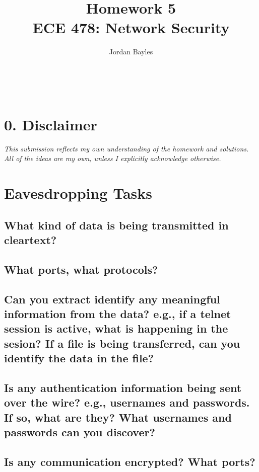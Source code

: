 \documentclass[12pt,letterpaper]{article}
\author{Jordan Bayles}
\title{Homework 5\\
\small ECE 478: Network Security}
\makeatletter
\let\thetitle\@title
\let\theauthor\@author
\let\thedate\@date
\makeatother
\begin{document}
\begin{flushright}
\theauthor\\
\thedate
\end{flushright}
\begin{center}
\thetitle
\end{center}

\section*{0. Disclaimer}
\emph{This submission reflects my own understanding of the homework and
solutions. All of the ideas are my own, unless I explicitly acknowledge otherwise.}

\section{Eavesdropping Tasks}
\subsection{What kind of data is being transmitted in cleartext?}

\subsection{What ports, what protocols?}

\subsection{Can you extract identify any meaningful information from the data?
e.g., if a telnet session is active, what is happening in the sesion? If a file
is being transferred, can you identify the data in the file?}

\subsection{Is any authentication information being sent over the wire? e.g.,
usernames and passwords. If so, what are they? What usernames and passwords can
you discover?}


\subsection{Is any communication encrypted? What ports?}
\end{document}
